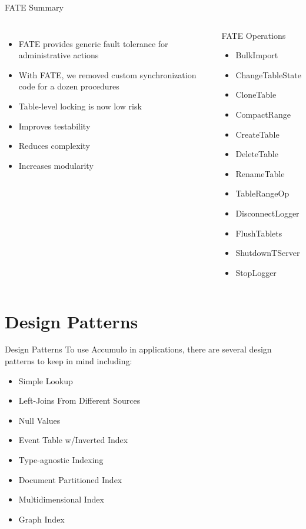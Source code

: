 \documentclass[t,landscape]{beamer}
\begin{document}
\begin{frame}{FATE Summary}
\begin{columns}
\small
\begin{itemize}
\item{FATE provides generic fault tolerance for administrative actions}
\item{With FATE, we removed custom synchronization code for a dozen procedures}
\item{Table-level locking is now low risk}
\item{Improves testability}
\item{Reduces complexity}
\item{Increases modularity}
\end{itemize}
\tiny
\begin{block}{FATE Operations}
\begin{itemize}
\item{BulkImport}
\item{ChangeTableState}
\item{CloneTable}
\item{CompactRange}
\item{CreateTable}
\item{DeleteTable}
\item{RenameTable}
\item{TableRangeOp}
\item{DisconnectLogger}
\item{FlushTablets}
\item{ShutdownTServer}
\item{StopLogger}
\end{itemize}
\end{block}
\end{columns}
\end{frame}

\section{Design Patterns}

\begin{frame}{Design Patterns}
To use Accumulo in applications, there are several design patterns to keep in mind including:
\begin{itemize}
\item{Simple Lookup}
\item{Left-Joins From Different Sources}
\item{Null Values}
\item{Event Table w/Inverted Index}
\item{Type-agnostic Indexing}
\item{Document Partitioned Index}
\item{Multidimensional Index}
\item{Graph Index}
\end{itemize}
\end{frame}
\end{document}
